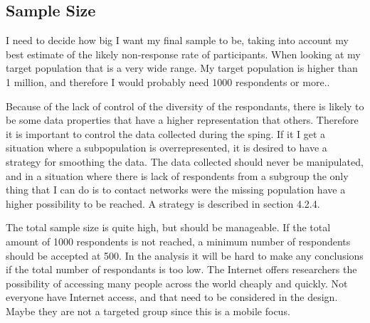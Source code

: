   \subsection{Sample Size}
    I need to decide how big I want my final sample to be, taking into account my best estimate of the likely non-response rate of participants. When looking at my target population that is a very wide range. My target population is higher than 1 million, and therefore I would probably need 1000 respondents or more..

    Because of the lack of control of the diversity of the respondants, there is likely to be some data properties that have a higher representation that others. Therefore it is important to control the data collected during the sping. If it I get a situation where a subpopulation is overrepresented, it is desired to have a strategy for smoothing the data. The data collected should never be manipulated, and in a situation where there is lack of respondents from a subgroup the only thing that I can do is to contact networks were the missing population have a higher possibility to be reached. A strategy is described in section 4.2.4. 

    The total sample size is quite high, but should be manageable. If the total amount of 1000 respondents is not reached, a minimum number of respondents should be accepted at 500. In the analysis it will be hard to make any conclusions if the total number of respondants is too low.  The Internet offers researchers the possibility of accessing many people across the world cheaply and quickly. Not everyone have Internet access, and that need to be considered in the design. Maybe they are not a targeted group since this is a mobile focus.

